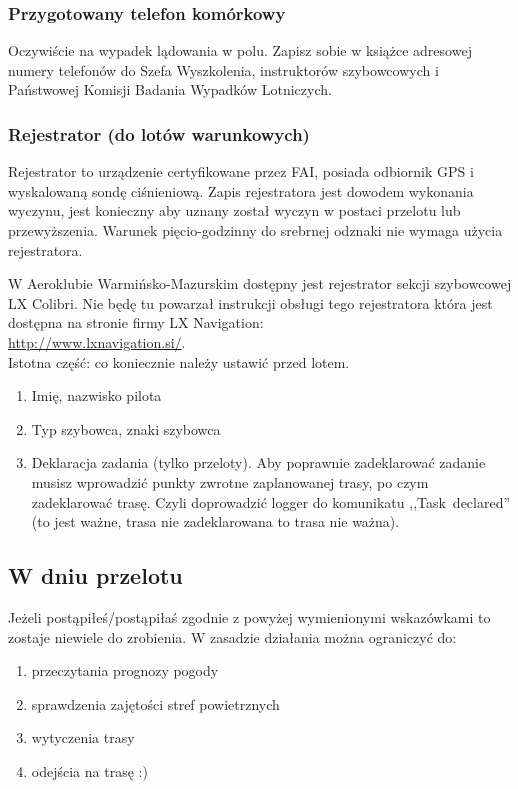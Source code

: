 \documentclass{article}
\begin{document}
\subsubsection{Przygotowany telefon komórkowy}
Oczywiście na wypadek lądowania w polu. Zapisz sobie w książce adresowej
numery telefonów do Szefa Wyszkolenia, instruktorów szybowcowych i 
Państwowej Komisji Badania Wypadków Lotniczych.

\subsubsection{Rejestrator (do lotów warunkowych)}
Rejestrator to urządzenie certyfikowane przez FAI, posiada odbiornik
GPS i wyskalowaną sondę ciśnieniową. Zapis rejestratora jest dowodem
wykonania wyczynu, jest konieczny aby uznany został
wyczyn w postaci przelotu lub przewyższenia. Warunek pięcio-godzinny
do srebrnej odznaki nie wymaga użycia rejestratora.

W Aeroklubie Warmińsko-Mazurskim dostępny
jest rejestrator sekcji szybowcowej LX Colibri. Nie będę tu powarzał
instrukcji obsługi tego rejestratora która jest dostępna na stronie
firmy LX Navigation: \\
\url{http://www.lxnavigation.si/}. \\

\noindent
Istotna część: co koniecznie należy ustawić przed lotem.
\begin{enumerate}
\item Imię, nazwisko pilota
\item Typ szybowca, znaki szybowca
\item Deklaracja zadania (tylko przeloty).
    Aby poprawnie zadeklarować zadanie musisz wprowadzić punkty zwrotne
    zaplanowanej trasy, po czym zadeklarować trasę. Czyli doprowadzić
    logger do komunikatu ,,Task~declared'' (to jest ważne, trasa nie
    zadeklarowana to trasa nie ważna).
\end{enumerate}

\subsection{W dniu przelotu}
Jeżeli postąpiłeś/postąpiłaś zgodnie z powyżej wymienionymi wskazówkami to
zostaje niewiele do zrobienia. W zasadzie działania można ograniczyć do:
\begin{enumerate}
\item przeczytania prognozy pogody
\item sprawdzenia zajętości stref powietrznych
\item wytyczenia trasy
\item odejścia na trasę :)
\end{enumerate}
\end{document}
